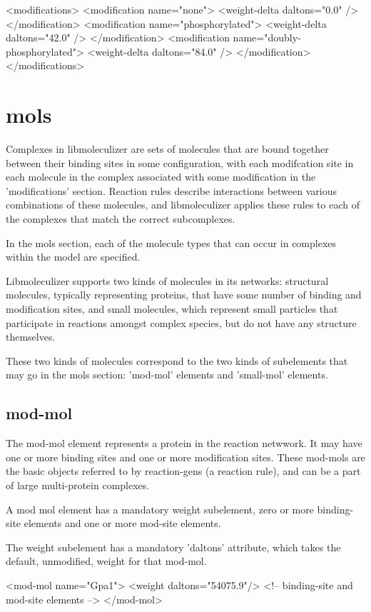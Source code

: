 <modifications>
  <modification name="none">
    <weight-delta daltons="0.0" />
  </modification>
  <modification name="phosphorylated">
    <weight-delta daltons="42.0" />
  </modification>
  <modification name="doubly-phosphorylated">
    <weight-delta daltons="84.0" />
  </modification>
</modifications>

\section{mols}

Complexes in libmoleculizer are sets of molecules that are bound
together between their binding sites in some configuration, with each
modifcation site in each molecule in the complex associated with some
modification in the 'modifications' section. Reaction rules describe
interactions between various combinations of these molecules, and
libmoleculizer applies these rules to each of the complexes that
match the correct subcomplexes.  

In the mols section, each of the molecule types that can occur in
complexes within the model are specified.

Libmoleculizer supports two kinds of molecules in its networks:
structural molecules, typically representing proteins, that have some
number of binding and modification sites, and small molecules, which
represent small particles that participate in reactions amongst
complex species, but do not have any structure themselves.

These two kinds of molecules correspond to the two kinds of
subelements that may go in the mols section: 'mod-mol' elements and
'small-mol' elements.   

\subsection{mod-mol}
The mod-mol element represents a protein in the reaction netwwork.  It
may have one or more binding sites  and one or more modification
sites.  These mod-mols are the basic objects referred to by
reaction-gens (a reaction rule), and can be a part of large
multi-protein complexes.  

A mod mol element has a mandatory weight subelement, zero or more
binding-site elements and one or more mod-site elements.  

The weight subelement has a mandatory 'daltons' attribute, which takes
the default, unmodified, weight for that mod-mol.

<mod-mol name="Gpa1">
  <weight daltons="54075.9"/>
  <!-- binding-site and mod-site elements -->
</mod-mol>

